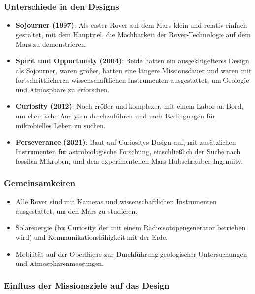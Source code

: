 \documentclass{vorlage-design-main}
\begin{document}
\hypertarget{unterschiede-in-den-designs}{%
\subsubsection{Unterschiede in den
Designs}\label{unterschiede-in-den-designs}}

\begin{itemize}

\item
  \textbf{Sojourner (1997)}: Als erster Rover auf dem Mars klein und
  relativ einfach gestaltet, mit dem Hauptziel, die Machbarkeit der
  Rover-Technologie auf dem Mars zu demonstrieren.
\item
  \textbf{Spirit und Opportunity (2004)}: Beide hatten ein
  ausgeklügelteres Design als Sojourner, waren größer, hatten eine
  längere Missionsdauer und waren mit fortschrittlicheren
  wissenschaftlichen Instrumenten ausgestattet, um Geologie und
  Atmosphäre zu erforschen.
\item
  \textbf{Curiosity (2012)}: Noch größer und komplexer, mit einem Labor
  an Bord, um chemische Analysen durchzuführen und nach Bedingungen für
  mikrobielles Leben zu suchen.
\item
  \textbf{Perseverance (2021)}: Baut auf Curiositys Design auf, mit
  zusätzlichen Instrumenten für astrobiologische Forschung,
  einschließlich der Suche nach fossilen Mikroben, und dem
  experimentellen Mars-Hubschrauber Ingenuity.
\end{itemize}

\hypertarget{gemeinsamkeiten}{%
\subsubsection{Gemeinsamkeiten}\label{gemeinsamkeiten}}

\begin{itemize}

\item
  Alle Rover sind mit Kameras und wissenschaftlichen Instrumenten
  ausgestattet, um den Mars zu studieren.
\item
  Solarenergie (bis Curiosity, der mit einem Radioisotopengenerator
  betrieben wird) und Kommunikationsfähigkeit mit der Erde.
\item
  Mobilität auf der Oberfläche zur Durchführung geologischer
  Untersuchungen und Atmosphärenmessungen.
\end{itemize}

\hypertarget{einfluss-der-missionsziele-auf-das-design}{%
\subsubsection{Einfluss der Missionsziele auf das
Design}\label{einfluss-der-missionsziele-auf-das-design}}
\end{document}
